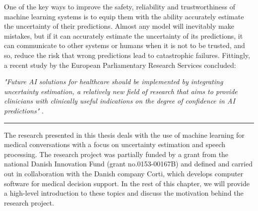 One of the key ways to improve the safety, reliability and trustworthiness of machine learning systems is to equip them with the ability accurately estimate the uncertainty of their predictions. 
Almost any model will inevitably make mistakes, but if it can accurately estimate the uncertainty of its predictions, it can communicate to other systems or humans when it is not to be trusted, and so, reduce the risk that wrong predictions lead to catastrophic failures.
Fittingly, a recent study by the European Parliamentary Research Services concluded: 

\begin{center}

\textit{"Future AI solutions for healthcare should be implemented by integrating uncertainty estimation, a relatively new field of research that aims to provide clinicians with clinically useful indications on the degree of confidence in AI predictions"} \parencite{europeanparliament_artificial_2022}. 

\end{center}


\vspace{0.5em}
\begin{center}
\noindent\rule{0.2\textwidth}{0.5pt}
\end{center}
\vspace{1em}

\noindent The research presented in this thesis deals with the use of machine learning for medical conversations with a focus on uncertainty estimation and speech processing. 
The research project was partially funded by a grant from the national Danish Innovation Fund (grant no.\@ 0153-00167B) and defined and carried out in collaboration with the Danish company Corti, which develops computer software for medical decision support. 
In the rest of this chapter, we will provide a high-level introduction to these topics and discuss the motivation behind the research project.



